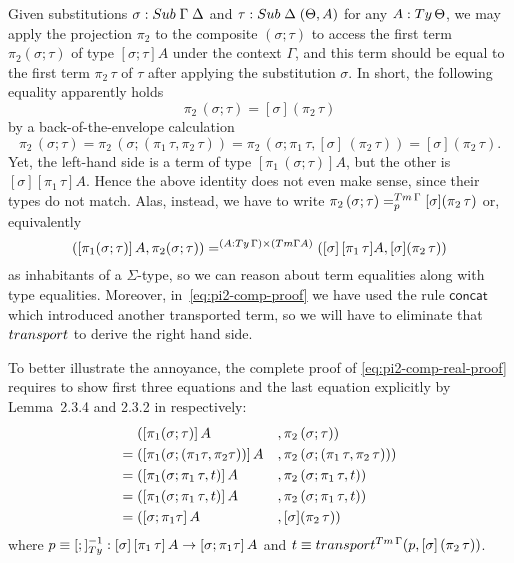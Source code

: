\documentclass[a4paper,UKenglish,numberwithinsect,cleveref,thm-restate]{lipics-v2021}
\begin{document}
\begin{example}
  Given substitutions $\sigma : \Sub\;\Gamma\; \Delta$ and $\tau : \Sub\;\Delta\;(\Theta, A)$ for any $A : \Ty\,\Theta$, we may apply the projection $\pi_2$ to the composite $(\sigma; \tau)$ to access the first term $\pi_2(\sigma; \tau)$ of type $[\sigma;\tau] A$ under the context $\Gamma$, and this term should be equal to the first term $\pi_2\,\tau$ of $\tau$ after applying the substitution $\sigma$. 
  In short, the following equality apparently holds
  \[
    \pi_2\,(\sigma ; \tau) = [\sigma] (\pi_2\,\tau)
  \]
  by a back-of-the-envelope calculation
  \begin{equation} \label{eq:pi2-comp-proof}
    \pi_2\,(\sigma ; \tau) 
    = \pi_2\,(\sigma; (\pi_1\,\tau, \pi_2\,\tau))
    = \pi_2\,(\sigma;\pi_1\,\tau, [\sigma]\,(\pi_2\,\tau))
    = [\sigma] (\pi_2\,\tau).
  \end{equation}
  Yet, the left-hand side is a term of type $[\pi_1\,(\sigma;\tau)] A$, but the other is $[\sigma] [\pi_1\,\tau] A$.
  Hence the above identity does not even make sense, since their types do not match.
  Alas, instead, we have to write $\pi_2\,(\sigma ; \tau) =^{\Tm\,\Gamma}_{p} [\sigma] (\pi_2\,\tau)$ or, equivalently
  \begin{equation}\label{eq:pi2-comp-real-proof}
    ([\pi_1(\sigma; \tau)]\,A, \pi_2(\sigma; \tau)) =^{(A : \Ty\,\Gamma) \times (\Tm \Gamma A)} ([\sigma]\,[\pi_1\,\tau]A, [\sigma] (\pi_2\,\tau))
  \end{equation}
  as inhabitants of a $\Sigma$-type, so we can reason about term equalities along with type equalities.
  Moreover, in~\eqref{eq:pi2-comp-proof} we have used the rule $\mathsf{concat}$ which introduced another transported term, so we will have to eliminate that $\transp$ to derive the right hand side.

  To better illustrate the annoyance, the complete proof of \eqref{eq:pi2-comp-real-proof} requires to show first three equations and the last equation explicitly by Lemma~2.3.4 and 2.3.2 in \cite{UFP2013} respectively:
  \begin{alignat*}{3}
         & ([\pi_1(\sigma; \tau)]\,A                    &&, \pi_2\,(\sigma ; \tau)) \label{eq:pi2-proof-1} \\
    = {} & ([\pi_1(\sigma; (\pi_1\tau , \pi_2\tau))]\,A &&, \pi_2\,(\sigma; (\pi_1\,\tau, \pi_2\,\tau))) \\
    = {} & ([\pi_1(\sigma;\pi_1\,\tau, t)]\,A &&, \pi_2\,(\sigma;\pi_1\,\tau, t)) \\
    = {} & ([\pi_1(\sigma;\pi_1\,\tau, t)]\,A &&, \pi_2\,(\sigma;\pi_1\,\tau, t)) \nonumber \\
    = {} & ([\sigma;\pi_1\tau]\,{A} &&, [\sigma] (\pi_2\,\tau)) \nonumber
  \end{alignat*}
  where $p \judgeq [;]_{\Ty}^{-1} : \sub{\sigma}{\sub{\pi_1\,\tau}{A}} \to \sub{\sigma; \pi_1 \tau}{A}$ and $t \judgeq\transfib{\Tm\,\Gamma}{p}{[\sigma]\,(\pi_2\,\tau)}$.
\end{example}
\end{document}
